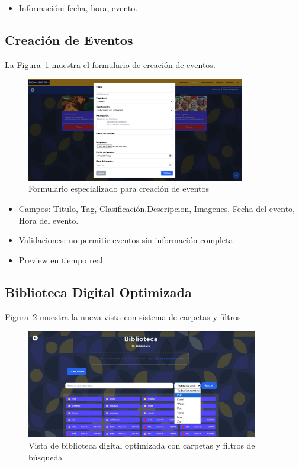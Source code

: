 \begin{itemize}
  \item Información: fecha, hora, evento.

\end{itemize}

\subsection{Creación de Eventos}

La Figura~\ref{fig:calendario-crear} muestra el formulario de creación de eventos.

\begin{figure}[H]
  \centering
  \includegraphics[width=0.85\textwidth]{project/images/imagen6.PNG}
  \caption{Formulario especializado para creación de eventos}
  \label{fig:calendario-crear}
\end{figure}

\begin{itemize}
  \item Campos: Titulo, Tag, Clasificación,Descripcion, Imagenes, Fecha del evento, Hora del evento.
  \item Validaciones: no permitir eventos sin información completa.
  \item Preview en tiempo real.
\end{itemize}

\subsection{Biblioteca Digital Optimizada}

Figura~\ref{fig:biblioteca} muestra la nueva vista con sistema de carpetas y filtros.

\begin{figure}[H]
  \centering
  \includegraphics[width=0.9\textwidth]{project/images/imagen7.png}
  \caption{Vista de biblioteca digital optimizada con carpetas y filtros de búsqueda}
  \label{fig:biblioteca}
\end{figure}

